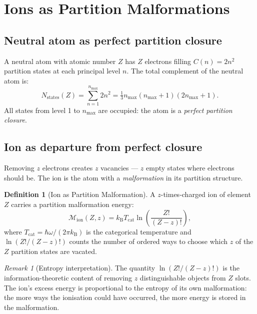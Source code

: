 \documentclass[twocolumn,10pt,a4paper]{article}
\theoremstyle{thmstyle}
\theoremstyle{definition}
\newtheorem{definition}[theorem]{Definition}
\theoremstyle{remark}
\newtheorem{remark}[theorem]{Remark}
\newcommand{\kB}{k_{\mathrm{B}}}
\newcommand{\Mop}{\mathcal{M}}
\newcommand{\Tcat}{T_{\mathrm{cat}}}
\begin{document}
\section{Ions as Partition Malformations}
\label{sec:malformation}

\subsection{Neutral atom as perfect partition closure}

A neutral atom with atomic number $Z$ has $Z$ electrons filling
$C(n) = 2n^2$ partition states at each principal level $n$. The total
complement of the neutral atom is:
\begin{equation}
N_{\mathrm{states}}(Z) = \sum_{n=1}^{n_{\max}} 2n^2
= \tfrac{1}{3}n_{\max}(n_{\max}+1)(2n_{\max}+1).
\label{eq:neutral_states}
\end{equation}
All states from level 1 to $n_{\max}$ are occupied: the atom is a
\emph{perfect partition closure}.

\subsection{Ion as departure from perfect closure}

Removing $z$ electrons creates $z$ vacancies --- $z$ empty states where
electrons should be. The ion is the atom with a \emph{malformation} in
its partition structure.

\begin{definition}[Ion as Partition Malformation]
\label{def:ion_malformation}
A $z$-times-charged ion of element $Z$ carries a partition malformation
energy:
\begin{equation}
\Mop_{\mathrm{ion}}(Z, z)
= \kB\Tcat\ln\!\left(\frac{Z!}{(Z-z)!}\right),
\label{eq:ion_mass}
\end{equation}
where $\Tcat = \hbar\omega/(2\pi\kB)$ is the categorical temperature
and $\ln(Z!/(Z-z)!)$ counts the number of ordered ways to choose which
$z$ of the $Z$ partition states are vacated.
\end{definition}

\begin{remark}[Entropy interpretation]
The quantity $\ln(Z!/(Z-z)!)$ is the information-theoretic content of
removing $z$ distinguishable objects from $Z$ slots. The ion's excess
energy is proportional to the entropy of its own malformation: the more
ways the ionisation could have occurred, the more energy is stored in
the malformation.
\end{remark}
\end{document}
